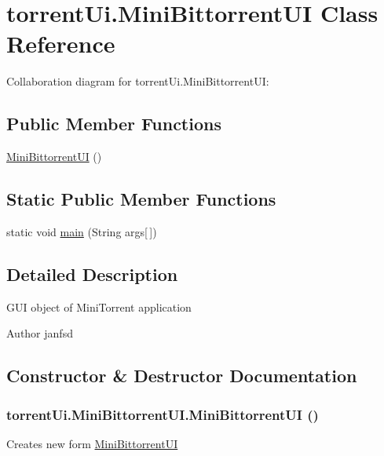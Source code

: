 \hypertarget{classtorrent_ui_1_1_mini_bittorrent_u_i}{
\section{torrentUi.MiniBittorrentUI Class Reference}
\label{classtorrent_ui_1_1_mini_bittorrent_u_i}
}
Collaboration diagram for torrentUi.MiniBittorrentUI:\subsection*{Public Member Functions}
\begin{DoxyCompactItemize}
\item 
\hyperlink{classtorrent_ui_1_1_mini_bittorrent_u_i_a9fa57e896f7f382c00089162190ee362}{MiniBittorrentUI} ()
\end{DoxyCompactItemize}
\subsection*{Static Public Member Functions}
\begin{DoxyCompactItemize}
\item 
static void \hyperlink{classtorrent_ui_1_1_mini_bittorrent_u_i_a7f4efe8c94bdb310a46b4a858c101ec9}{main} (String args\mbox{[}$\,$\mbox{]})
\end{DoxyCompactItemize}


\subsection{Detailed Description}
GUI object of MiniTorrent application \begin{DoxyAuthor}{Author}
janfsd 
\end{DoxyAuthor}


\subsection{Constructor \& Destructor Documentation}
\hypertarget{classtorrent_ui_1_1_mini_bittorrent_u_i_a9fa57e896f7f382c00089162190ee362}{
\subsubsection[{MiniBittorrentUI}]{\setlength{\rightskip}{0pt plus 5cm}torrentUi.MiniBittorrentUI.MiniBittorrentUI ()}}
\label{classtorrent_ui_1_1_mini_bittorrent_u_i_a9fa57e896f7f382c00089162190ee362}
Creates new form \hyperlink{classtorrent_ui_1_1_mini_bittorrent_u_i}{MiniBittorrentUI} 

